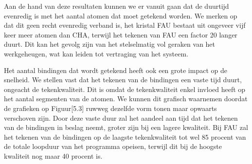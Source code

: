 Aan de hand van deze resultaten kunnen we er vanuit gaan dat de duurtijd evenredig is met het aantal atomen dat moet getekend worden. We merken op dat dit geen recht evenredig verband is, het kristal FAU bestaat uit ongeveer vijf keer meer atomen dan CHA, terwijl het tekenen van FAU een factor 20 langer duurt. Dit kan het gevolg zijn van het stelselmatig vol geraken van het werkgeheugen, wat kan leiden tot vertraging van het systeem.  
\par
Het aantal bindingen dat wordt getekend heeft ook een grote impact op de snelheid. We stellen vast dat het tekenen van de bindingen een vaste tijd duurt, ongeacht de tekenkwaliteit. Dit is omdat de tekenkwaliteit enkel invloed heeft op het aantal segmenten van de atomen. We kunnen dit grafisch waarnemen doordat de grafieken op Figuur[5.3] ruwweg dezelfde vorm tonen maar opwaarts verschoven zijn. Door deze vaste duur zal het aandeel aan tijd dat het tekenen van de bindingen in beslag neemt, groter zijn bij een lagere kwaliteit. Bij FAU zal het tekenen van de bindingen op de laagste tekenkwaliteit tot wel 85 procent van de totale loopduur van het programma opeisen, terwijl dit bij de hoogste kwaliteit nog maar 40 procent is.

